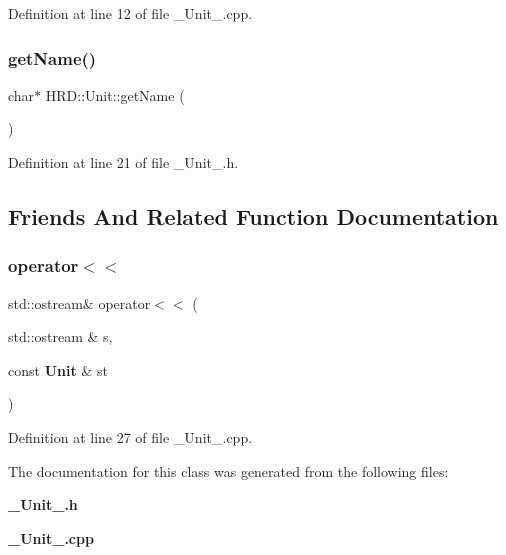 Definition at line 12 of file \+\_\+\+Unit\+\_\+.\+cpp.

\mbox{\label{class_h_r_d_1_1_unit_ae182e56ce7319b2ff4824c5ba7a7f945}} 
\subsubsection{get\+Name()}
{\footnotesize\ttfamily char$\ast$ H\+R\+D\+::\+Unit\+::get\+Name (\begin{DoxyParamCaption}{ }\end{DoxyParamCaption})\hspace{0.3cm}{\ttfamily [inline]}}



Definition at line 21 of file \+\_\+\+Unit\+\_\+.\+h.



\subsection{Friends And Related Function Documentation}
\mbox{\label{class_h_r_d_1_1_unit_ac0bce1523e9a2843a631a23662ac239b}} 
\subsubsection{operator$<$$<$}
{\footnotesize\ttfamily std\+::ostream\& operator$<$$<$ (\begin{DoxyParamCaption}\item[{std\+::ostream \&}]{s,  }\item[{const \textbf{ Unit} \&}]{st }\end{DoxyParamCaption})\hspace{0.3cm}{\ttfamily [friend]}}



Definition at line 27 of file \+\_\+\+Unit\+\_\+.\+cpp.



The documentation for this class was generated from the following files\+:\begin{DoxyCompactItemize}
\item 
\textbf{ \+\_\+\+Unit\+\_\+.\+h}\item 
\textbf{ \+\_\+\+Unit\+\_\+.\+cpp}\end{DoxyCompactItemize}
